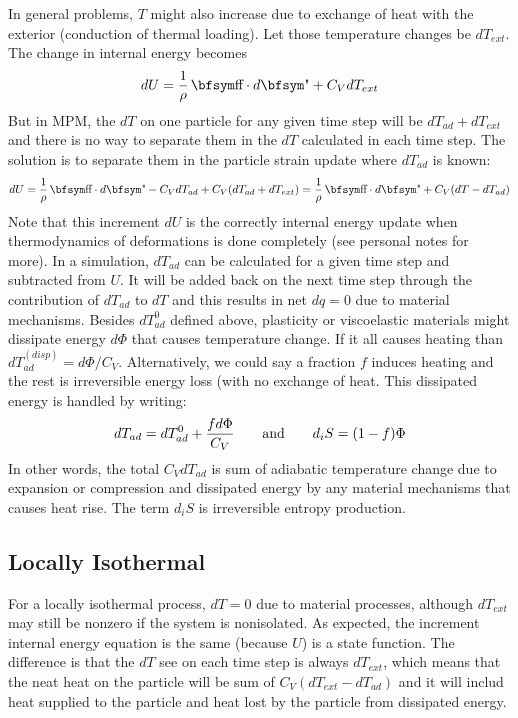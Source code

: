 \documentclass[11pt]{article}
\begin{document}
In general problems, $T$ might also increase due to exchange of heat with the exterior (conduction of thermal loading). Let those temperature changes be $dT_{ext}$. The change in internal energy becomes
\begin{equation}
    dU = {1\over \rho}\thinspace \st\cdot d\et + C_V dT_{ext}
\end{equation}
But in MPM, the $dT$ on one particle for any given time step will be $dT_{ad}+dT_{ext}$ and there is no way to separate them in the $dT$ calculated in each time step. The solution is to separate them in the particle strain update where $dT_{ad}$ is known:
\begin{equation}
    dU = {1\over \rho}\thinspace \st\cdot d\et - C_V dT_{ad} + C_V (dT_{ad}+dT_{ext}) = {1\over \rho}\thinspace \st\cdot d\et + C_V(dT-dT_{ad})
\end{equation}
Note that this increment $dU$ is the correctly internal energy update when thermodynamics of deformations is done completely (see personal notes for more).
In a simulation, $dT_{ad}$ can be calculated for a given time step and subtracted from $U$. It will be added back on the next time step through the contribution of $dT_{ad}$ to $dT$ and this results in net $dq=0$ due to material mechanisms. Besides $dT_{ad}^0$ defined above, plasticity or viscoelastic materials might dissipate energy $d\Phi$ that causes temperature change. If it all causes heating than $dT_{ad}^{(disp)} = d\Phi/C_V$. Alternatively, we could say a fraction $f$ induces heating and the rest is irreversible energy loss (with no exchange of heat. This dissipated energy is handled by writing:
\begin{equation}
    dT_{ad} = dT_{ad}^0 + {fd\Phi\over C_V}   \qquad {\rm and} \qquad d_iS = (1-f)\Phi
\end{equation}
In other words, the total $C_V dT_{ad}$ is sum of adiabatic temperature change due to expansion or compression and dissipated energy by any material mechanisms that causes heat rise. The term $d_iS$ is irreversible entropy production.

\subsection{Locally Isothermal}

For a locally isothermal process, $dT=0$ due to material processes, although $dT_{ext}$ may still be nonzero if the system is nonisolated. As expected, the increment internal energy equation is the same (because $U$) is a state function. The difference is that the $dT$ see on each time step is always $dT_{ext}$, which means that the neat heat on the particle will be sum of $C_V(dT_{ext}-dT_{ad})$ and it will includ heat supplied to the particle and heat lost by the particle from dissipated energy.
\end{document}
